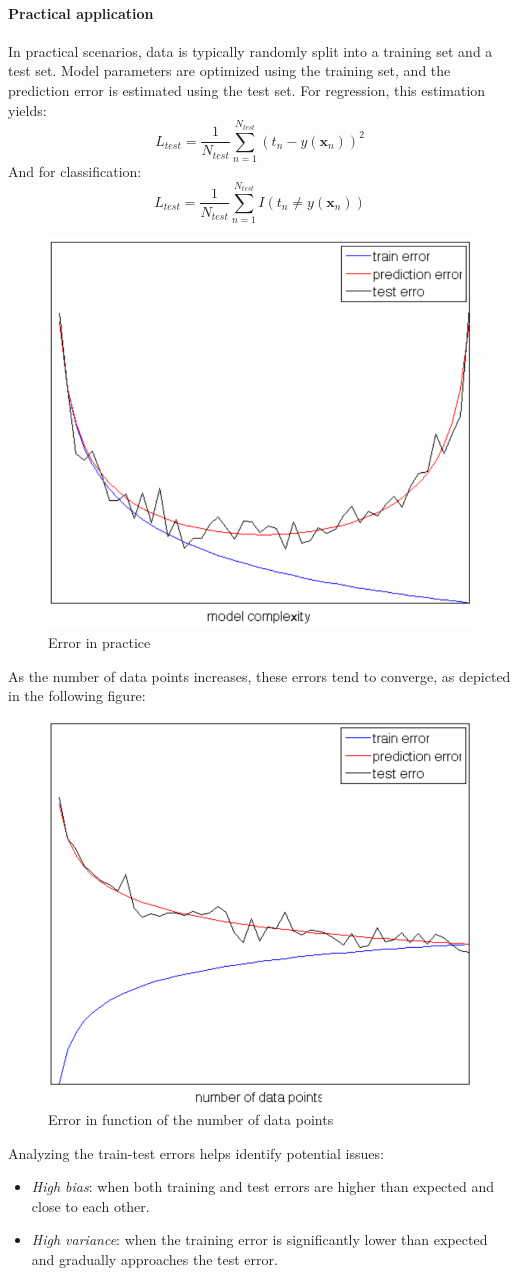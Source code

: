 \paragraph*{Practical application}
In practical scenarios, data is typically randomly split into a training set and a test set. 
Model parameters are optimized using the training set, and the prediction error is estimated using the test set. 
For regression, this estimation yields:
\[L_{test}=\dfrac{1}{N_{test}}\sum_{n=1}^{N_{test}}\left(t_n-y(\textbf{x}_n)\right)^2\]
And for classification:
\[L_{test}=\dfrac{1}{N_{test}}\sum_{n=1}^{N_{test}}I(t_n\neq y(\textbf{x}_n))\]
\begin{figure}[H]
    \centering
    \includegraphics[width=0.35\linewidth]{images/error1.png}
    \caption{Error in practice}
\end{figure}
As the number of data points increases, these errors tend to converge, as depicted in the following figure:
\begin{figure}[H]
    \centering
    \includegraphics[width=0.35\linewidth]{images/error2.png}
    \caption{Error in function of the number of data points}
\end{figure}
Analyzing the train-test errors helps identify potential issues:
\begin{itemize}
    \item \textit{High bias}: when both training and test errors are higher than expected and close to each other.
    \item \textit{High variance}: when the training error is significantly lower than expected and gradually approaches the test error.
\end{itemize}


